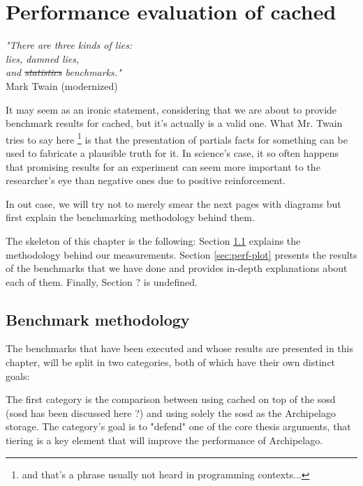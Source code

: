 \chapter{Performance evaluation of cached}\label{ch:cached-evaluation}

\begin{flushright}
	\textit{"There are three kinds of lies:\\
		lies, damned lies, \\
		and \sout{statistics} benchmarks."}	\\

	Mark Twain (modernized)
\end{flushright}

It may seem as an ironic statement, considering that we are about to provide 
benchmark results for cached, but it's actually is a valid one. What Mr.  Twain 
tries to say here
\footnote{
	and that's a phrase usually not heard in programming contexts...
}
is that the presentation of partials facts for something can be used to 
fabricate a plausible truth for it.
In science's case, it so often happens that promising results for an experiment 
can seem more important to the researcher's eye than negative ones due to 
positive reinforcement.

In out case, we will try not to merely smear the next pages with diagrams but 
first explain the benchmarking methodology behind them.

The skeleton of this chapter is the following: Section \ref{sec:perf-meth} 
explains the methodology behind our measurements. Section \ref{sec:perf-plot} 
presents the results of the benchmarks that we have done and provides in-depth 
explanations about each of them. Finally, Section ? is undefined.

\section{Benchmark methodology}\label{sec:perf-meth}

The benchmarks that have been executed and whose results are presented in this 
chapter, will be split in two categories, both of which have their own distinct 
goals:

The first category is the comparison between using cached on top of the sosd 
(sosd has been discussed here ?) and using solely the sosd as the Archipelago 
storage. The category's goal is to "defend" one of the core thesis arguments, 
that tiering is a key element that will improve the performance of Archipelago. 

